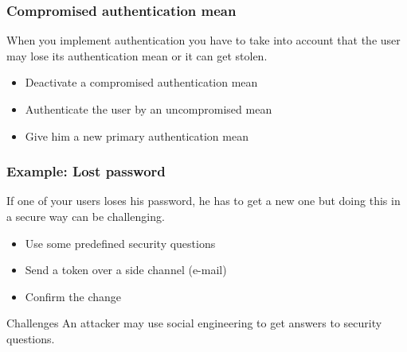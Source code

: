 \begin{frame}
\frametitle{Compromised authentication mean}
When you implement authentication you have to take into account that
the user may lose its authentication mean or it can get stolen.
\begin{itemize}
\item Deactivate a compromised authentication mean
\item Authenticate the user by an uncompromised mean
\item Give him a new primary authentication mean
\end{itemize}
\end{frame}

\begin{frame}
\frametitle{Example: Lost password}
If one of your users loses his password, he has to get a new one but doing
this in a secure way can be challenging.
\begin{itemize}
\item Use some predefined security questions
\item Send a token over a side channel {\small (e-mail)}
\item Confirm the change
\end{itemize}
\begin{block}{Challenges}
An attacker may use social engineering to get answers to security questions.
\end{block}
\end{frame}

